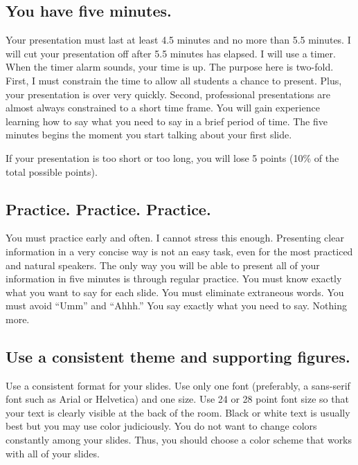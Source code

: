 \documentclass[letterpaper]{memoir}
\newcommand{\insertslide}[2]{%
  \framebox{\texttt{[image: \#2]}}
}
\begin{document}
\subsection*{You have five minutes.}

\sidepar{\insertslide{3}{5_in_5_overview.pdf}}
Your presentation must last at least 4.5 minutes and no more than 5.5 minutes. I will cut your presentation off after 5.5 minutes has elapsed. I will use a timer. When the timer alarm sounds, your time is up. The purpose here is two-fold. First, I must constrain the time to allow all students a chance to present. Plus, your presentation is over very quickly. Second, professional presentations are almost always constrained to a short time frame. You will gain experience learning how to say what you need to say in a brief period of time.  The five minutes begins the moment you start talking about your first slide. 

If your presentation is too short or too long, you will lose 5 points (10\% of the total possible points).

\subsection*{Practice. Practice. Practice.}

\sidepar{\insertslide{8}{5_in_5_overview.pdf}}
You must practice early and often. I cannot stress this enough. Presenting clear information in a very concise way is not an easy task, even for the most practiced and natural speakers. The only way you will be able to present all of your information in five minutes is through regular practice. You must know exactly what you want to say for each slide. You must eliminate extraneous words. You must avoid “Umm” and “Ahhh.” You say exactly what you need to say. Nothing more. 

\subsection*{Use a consistent theme and supporting figures.}

\sidepar{\insertslide{9}{5_in_5_overview.pdf}}
Use a consistent format for your slides. Use only one font (preferably, a sans-serif font such as Arial or Helvetica) and one size. Use 24 or 28 point font size so that your text is clearly visible at the back of the room. Black or white text is usually best but you may use color judiciously. You do not want to change colors constantly among your slides. Thus, you should choose a color scheme that works with all of your slides. 
\end{document}

